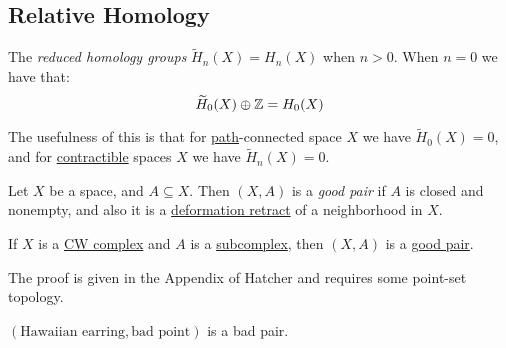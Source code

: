 \subsection{Relative Homology}
\begin{definition}\label{def:reduced-homology-group}
	The \emph{reduced homology groups} $\widetilde{H}_n(X) = H_n(X)$ when $n > 0$. When $n = 0$ we have that:
	\[
		\widetilde{H}_0(X) \oplus \mathbb{\MakeUppercase{z}} = H_0(X)
	\]
\end{definition}
\begin{remark}
	The usefulness of this is that for \hyperref[def:path]{path}-connected space $X$ we have $\widetilde{H}_0(X) = 0$, and for
	\hyperref[def:contractible]{contractible} spaces $X$ we have $\widetilde{H}_n(X) = 0$.
\end{remark}

\begin{definition}\label{def:good-pair}
	Let $X$ be a space, and $A \subseteq X$. Then $(X, A)$ is a \emph{good pair} if $A$ is closed and nonempty, and also it is a
	\hyperref[def:deformation-retraction]{deformation retract} of a neighborhood in $X$.
\end{definition}

\begin{eg}
	If $X$ is a \hyperref[def:CW-Complex]{CW complex} and $A$ is a \hyperref[def:CW-subcomplex]{subcomplex}, then $(X, A)$ is a \hyperref[def:good-pair]{good pair}.

	The proof is given in the Appendix of Hatcher\cite{hatcher2002algebraic} and requires some point-set topology.
\end{eg}

\begin{eg}
	$(\text{Hawaiian earring}, \text{bad point})$ is a bad pair.
\end{eg}

